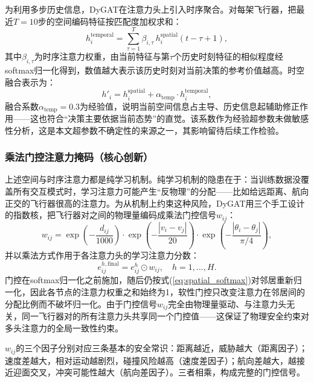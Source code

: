\documentclass[12pt,a4paper,UTF8]{ctexart}
\begin{document}
为利用多步历史信息，DyGAT在注意力头上引入时序聚合。对每架飞行器，把最近$T=10$步的空间编码特征按匹配度加权求和：
\begin{equation}
    h_i^{\text{temporal}} = \sum_{\tau=1}^{T} \beta_{i,\tau}\, h_i^{\text{spatial}}(t-\tau+1),
    \label{eq:temporal_attn}
\end{equation}
其中$\beta_{i,\tau}$为时序注意力权重，由当前特征与第$\tau$个历史时刻特征的相似程度经softmax归一化得到，数值越大表示该历史时刻对当前决策的参考价值越高。时空融合表示为：
\begin{equation}
    h'_i = h_i^{\text{spatial}} + \alpha_{\text{temp}} \cdot h_i^{\text{temporal}},
    \label{eq:temporal_fusion}
\end{equation}
融合系数$\alpha_{\text{temp}}=0.3$为经验值，说明当前空间信息占主导、历史信息起辅助修正作用——这也符合“决策主要依据当前态势”的直觉。该系数作为经验超参数未做敏感性分析，这是本文超参数不确定性的来源之一，其影响留待后续工作检验。

\subsubsection{乘法门控注意力掩码（核心创新）}

上述空间与时序注意力都是纯学习机制。纯学习机制的隐患在于：当训练数据没覆盖所有交互模式时，学习注意力可能产生“反物理”的分配——比如给远距离、航向正交的飞行器很高的注意力。为从机制上约束这种风险，DyGAT用三个手工设计的指数核，把飞行器对之间的物理量编码成乘法门控信号$w_{ij}$：
\begin{equation}
    w_{ij} = \exp\!\left(-\frac{d_{ij}}{1000}\right) \cdot \exp\!\left(-\frac{|v_i - v_j|}{20}\right) \cdot \exp\!\left(-\frac{|\theta_i - \theta_j|}{\pi/4}\right),
    \label{eq:gating_w}
\end{equation}
并以乘法方式作用于各注意力头的学习注意力分数：
\begin{equation}
    e_{ij}^{h,\text{final}} = e_{ij}^{h} \odot w_{ij},\quad h=1,\ldots,H.
    \label{eq:gating_final}
\end{equation}
门控在softmax归一化之前施加，随后仍按式(\ref{eq:spatial_softmax})对邻居重新归一化，因此各节点的注意力权重之和始终为1，软性门控只改变注意力在邻居间的分配比例而不破坏归一化。由于门控信号$w_{ij}$完全由物理量驱动、与注意力头无关，同一飞行器对的所有注意力头共享同一个门控值——这保证了物理安全约束对多头注意力的全局一致性约束。

$w_{ij}$的三个因子分别对应三条基本的安全常识：距离越近，威胁越大（距离因子）；速度差越大，相对运动越剧烈，碰撞风险越高（速度差因子）；航向差越大，越接近迎面交叉，冲突可能性越大（航向差因子）。三者相乘，构成完整的门控信号。
\end{document}
